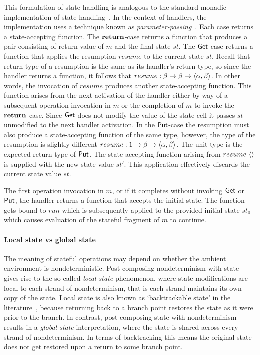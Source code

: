 \documentclass[12pt,phd,lfcs,twoside,openright,logo,leftchapter,normalheadings]{infthesis}
\theoremstyle{plain}
\theoremstyle{definition}
\begin{document}
This formulation of state handling is analogous to the standard
monadic implementation of state handling~\citep{Wadler95}. In the
context of handlers, the implementation uses a technique known as
\emph{parameter-passing}~\citep{PlotkinP09,Pretnar15}.
%
Each case returns a state-accepting function.
%
The $\mathbf{return}$-case returns a function that produces a pair consisting
of return value of $m$ and the final state $st$.
%
The $\mathsf{Get}$-case returns a function that applies the resumption
$resume$ to the current state $st$. Recall that return type of a
resumption is the same as its handler's return type, so since the
handler returns a function, it follows that
$resume : \beta \to \beta \to \langle \alpha, \beta \rangle$. In other words,
the invocation of $resume$ produces another state-accepting
function. This function arises from the next activation of the handler
either by way of a subsequent operation invocation in $m$ or the
completion of $m$ to invoke the $\mathbf{return}$-case. Since $\mathsf{Get}$ does not
modify the value of the state cell it passes $st$ unmodified to the
next handler activation.
%
In the $\mathsf{Put}$-case the resumption must also produce a state-accepting
function of the same type, however, the type of the resumption is
slightly different
$resume : 1 \to \beta \to \langle \alpha, \beta \rangle$. The unit
type is the expected return type of $\mathsf{Put}$. The state-accepting
function arising from $resume~\langle  \rangle$ is supplied with the new state
value $st'$. This application effectively discards the current state
value $st$.

The first operation invocation in $m$, or if it completes without
invoking $\mathsf{Get}$ or $\mathsf{Put}$, the handler returns a function that accepts
the initial state. The function gets bound to $run$ which is
subsequently applied to the provided initial state $st_0$ which causes
evaluation of the stateful fragment of $m$ to continue.

\paragraph{Local state vs global state} The meaning of stateful
operations may depend on whether the ambient environment is
nondeterministic.  Post-composing nondeterminism with state gives rise
to the so-called \emph{local state} phenomenon, where state
modifications are local to each strand of nondeterminism, that is each
strand maintains its own copy of the state. Local state is also known
as `backtrackable state' in the literature~\cite{GibbonsH11}, because
returning back to a branch point restores the state as it were prior
to the branch. In contrast, post-composing state with nondeterminism
results in a \emph{global state} interpretation, where the state is
shared across every strand of nondeterminism. In terms of backtracking
this means the original state does not get restored upon a return to
some branch point.
\end{document}

